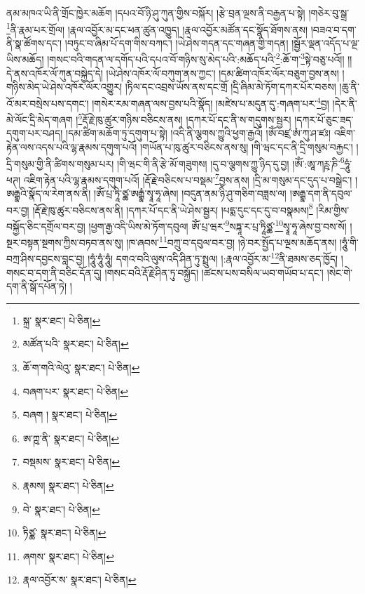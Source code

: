 ནམ་མཁའ་ཡི་ནི་གྲོང་ཁྱེར་མཆོག །དཔའ་བོ་ཉི་ཤུ་ཀུན་གྱིས་བསྐོར། །རྩེ་བྲན་ལྔས་ནི་བརྒྱན་པ་སྟེ། །གཅེར་བུ་སྒྲ་\footnote{སྐྲ་  སྣར་ཐང་།  པེ་ཅིན། }ནི་རྣམ་པར་གྲོལ། །རྣལ་འབྱོར་མ་དང་ཕན་ཚུན་འཁྱུད། །རྣལ་འབྱོར་མཚོན་དང་སྣོད་ཐོགས་ནས། །བཟའ་བ་དག་ནི་སྣ་ཚོགས་དང་། །བཏུང་བ་ཞིམ་པོ་དག་གིས་བཀང་། །ཡེ་ཤེས་གདན་དང་གཞན་གྱི་གདན། །སྦྱོར་ལྡན་འདོད་པ་ལྔ་ཡིས་མཆོད། །གསང་བའི་གདན་ལ་དགོད་པའི་དཔའ་བོ་གཉིས་སུ་མེད་པའི་:མཆོད་པའི་\footnote{མཚོན་པའི་  སྣར་ཐང་།  པེ་ཅིན། }:ཆོ་ག་\footnote{ཆོ་ག་གའི་ལེའུ་  སྣར་ཐང་།  པེ་ཅིན། }སྟེ་བཅུ་པའོ།། །།དེ་ནས་འཁོར་ལོ་ཀུན་བསྐྱེད་དེ། །ཡེ་ཤེས་འཁོར་ལོ་བཀུག་ནས་ཀྱང་། །དམ་ཚིག་འཁོར་ལོར་བཅུག་བྱས་ནས། །གཉིས་མེད་ཡེ་ཤེས་འཁོར་ལོར་འགྱུར། །ཏིལ་དང་འབྲས་ཡོས་ནས་དང་གྲོ །དྲི་ཞིམ་མེ་ཏོག་དཀར་པོར་བཅས། །ཆུ་ནི་འོ་མར་བསྲེས་པས་དགང་། །གསེར་རམ་གཞན་ལས་བྱས་པའི་སྣོད། །མཛེས་པ་མདུན་དུ་:གཞག་པར་\footnote{བཞག་པར་  སྣར་ཐང་།  པེ་ཅིན། }བྱ། །དེར་ནི་མེ་ལོང་དྲི་མེད་གཞག །\footnote{བཞག །  སྣར་ཐང་།  པེ་ཅིན། }རྡོ་རྗེ་ཁུ་ཚུར་གཉིས་བཅིངས་ནས། །དཀར་པོ་དང་ནི་ས་གདུགས་སྦྱར། །དཀར་པོ་ཅུང་ཟད་དགུག་པར་བཤད། །དམ་ཚིག་མཆོག་ཏུ་དགུག་པ་སྟེ། །འདི་ནི་ལྕགས་ཀྱུའི་ཕྱག་རྒྱའོ། །ཨོཾ་བཛྲ་ཨཾ་ཀུ་ཤ་ཛཿ། འཇིག་རྟེན་ལས་འདས་པའི་ལྷ་རྣམས་དགུག་པའོ། །གཡོན་པ་ཁུ་ཚུར་བཅིངས་ནས་སུ། །གི་ཝང་དང་ནི་དྲི་གསུམ་བརྐྱང་། །དྲི་གསུམ་གྱི་ནི་ཚིགས་གསུམ་པར། །གི་ཝང་གི་ནི་རྩེ་མོ་གཟུགས། །དུ་བ་ལྕགས་ཀྱུ་ཉིད་དུ་བྱ། །ཨོཾ་:ཨཱ་ཀཪྵ་ཎི་\footnote{ཨ་ཀྵ་ནི་  སྣར་ཐང་།  པེ་ཅིན། }ཧཱུཾ་ཕཊ། འཇིག་རྟེན་པའི་ལྷ་རྣམས་དགུག་པའོ། །རྡོ་རྗེ་བཅིངས་པ་བསྡམ་\footnote{བསྡམས་  སྣར་ཐང་།  པེ་ཅིན། }བྱས་ནས། །དྲི་མ་གསུམ་དང་དུད་པ་བསྒྲེང་། །ཨརྒྷའི་སྣོད་ལ་རེག་ནས་ནི། །ཨོཾ་པྲ་ཏཱི་ཙྪ་ཨརྒྷཾ་སྭཱ་ཧཱ་ཞེས། །བདུན་ནམ་ཉི་ཤུ་གཅིག་བཟླས་ལ། །ཨརྒྷ་དག་ནི་དབུལ་བར་བྱ། །རྡོ་རྗེ་ཁུ་ཚུར་བཅིངས་ནས་ནི། །དཀར་པོ་དང་ནི་ཡེ་ཤེས་སྦྱར། །པདྨ་དུང་དང་དུ་བ་བསྣམས།\footnote{རྣམས།  སྣར་ཐང་།  པེ་ཅིན། } །རིམ་གྱིས་བསྐྱོད་ཅིང་དགྲོལ་བར་བྱ། །ཕྱག་རྒྱ་འདི་ཡིས་མེ་ཏོག་དབུལ། ཨོཾ་པྲ་ཝར་\footnote{བེ་  སྣར་ཐང་།  པེ་ཅིན། }སཏྐཱ་ར་པྲ་ཏཱིཙྪ་\footnote{ཏིཙྪ་  སྣར་ཐང་།  པེ་ཅིན། }སྭཱ་ཧཱ་ཞེས་བྱ་བས་སོ། །སྔར་བསྟན་སྔགས་ཀྱིས་བཏབ་ནས་སུ། །ཁ་ཞབས་\footnote{ཞགས་  སྣར་ཐང་།  པེ་ཅིན། }བཀྲུ་བ་དབུལ་བར་བྱ། །ཉེ་བར་སྤྱོད་པ་ལྔས་མཆོད་ནས། །ཧཱུཾ་གི་བཀྲ་ཤིས་དབྱངས་བླང་བྱ། །ཧཱུཾ་ཧཱུཾ་ཧཱུཾ། དགའ་བའི་ལུས་འདི་ཤིན་ཏུ་སྤྲུལ། །:རྣལ་འབྱོར་མ་\footnote{རྣལ་འབྱོར་ས་  སྣར་ཐང་།  པེ་ཅིན། }ནི་ཐམས་ཅད་ཁྱོད། །གསང་བ་དག་ནི་བཅིང་དོན་དུ། །གསང་བའི་རྡོ་རྗེ་ཤིན་ཏུ་བསྐྱོད། །ཚངས་པས་བསིལ་ཡབ་གཡོབ་པ་དང་། །སེང་གེ་དག་ནི་སྒོ་དཔོན་ཏེ། །
